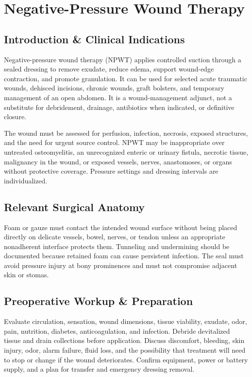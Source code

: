 \chapter{Negative-Pressure Wound Therapy}

\section*{Introduction \& Clinical Indications}
Negative-pressure wound therapy (NPWT) applies controlled suction through a sealed dressing to remove exudate, reduce edema, support wound-edge contraction, and promote granulation. It can be used for selected acute traumatic wounds, dehisced incisions, chronic wounds, graft bolsters, and temporary management of an open abdomen. It is a wound-management adjunct, not a substitute for debridement, drainage, antibiotics when indicated, or definitive closure.

The wound must be assessed for perfusion, infection, necrosis, exposed structures, and the need for urgent source control. NPWT may be inappropriate over untreated osteomyelitis, an unrecognized enteric or urinary fistula, necrotic tissue, malignancy in the wound, or exposed vessels, nerves, anastomoses, or organs without protective coverage. Pressure settings and dressing intervals are individualized.

\section*{Relevant Surgical Anatomy}
Foam or gauze must contact the intended wound surface without being placed directly on delicate vessels, bowel, nerves, or tendon unless an appropriate nonadherent interface protects them. Tunneling and undermining should be documented because retained foam can cause persistent infection. The seal must avoid pressure injury at bony prominences and must not compromise adjacent skin or stomas.

\section*{Preoperative Workup \& Preparation}
Evaluate circulation, sensation, wound dimensions, tissue viability, exudate, odor, pain, nutrition, diabetes, anticoagulation, and infection. Debride devitalized tissue and drain collections before application. Discuss discomfort, bleeding, skin injury, odor, alarm failure, fluid loss, and the possibility that treatment will need to stop or change if the wound deteriorates. Confirm equipment, power or battery supply, and a plan for transfer and emergency dressing removal.

